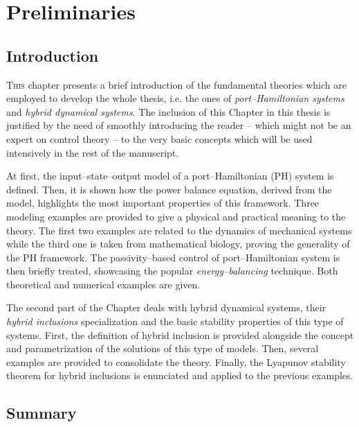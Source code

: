 
\chapter{Preliminaries}
\label{chap:preliminaries}
\minitoc

\thispagestyle{empty}

\newpage
{}
%
\section{Introduction\label{sec:2_intro}}
\lettrine[lines=4]{\color{brickred}T}{his} chapter presents a brief introduction of the fundamental theories which are employed to develop the whole thesis, i.e. the ones of \textit{port--Hamiltonian systems} and \textit{hybrid dynamical systems}. The inclusion of this Chapter in this thesis is justified by the need of smoothly introducing the reader -- which might not be an expert on control theory -- to the very basic concepts which will be used intensively in the rest of the manuscript.
%
\newline

%
At first, the input--state--output model of a port--Hamiltonian (PH) system is defined. Then, it is shown how the power balance equation, derived from the model, highlights the most important properties of this framework. Three modeling examples are provided to give a physical and practical meaning to the theory. The first two examples are related to the dynamics of mechanical systems while the third one is taken from mathematical biology, proving the generality of the PH framework.   
The passivity--based control of port--Hamiltonian system is then briefly treated, showcasing the popular \textit{energy--balancing} technique. Both theoretical and numerical examples are given. 
%
\newline

%
The second part of the Chapter deals with hybrid dynamical systems, their \textit{hybrid inclusions} specialization and the basic stability properties of this type of systems. First, the definition of hybrid inclusion is provided alongside the concept and parametrization of the solutions of this type of models. Then, several examples are provided to consolidate the theory. Finally, the Lyapunov stability theorem for hybrid inclusions is enunciated and applied to the previous examples. 
%

\clearpage


\section{Summary}
 

